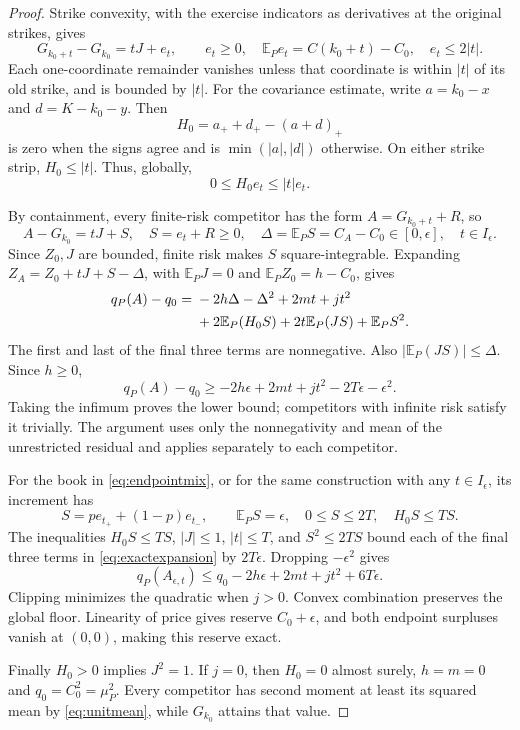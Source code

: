 \documentclass[11pt,a4paper]{amsart}
\theoremstyle{plain}
\theoremstyle{definition}
\theoremstyle{remark}
\newcommand{\EE}{\mathbb{E}}
\begin{document}
\begin{proof}
Strike convexity, with the exercise indicators as derivatives at the original strikes, gives
\begin{equation}\label{eq:strikeremainder}
 G_{k_0+t}-G_{k_0}=tJ+e_t,\qquad
 e_t\ge0,\quad\EE_Pe_t=C(k_0+t)-C_0,\quad e_t\le2|t|.
\end{equation}
Each one-coordinate remainder vanishes unless that coordinate is within $|t|$ of its old strike, and is bounded by $|t|$. For the covariance estimate, write $a=k_0-x$ and $d=K-k_0-y$. Then
\[
 H_0=a_++d_+-(a+d)_+
\]
is zero when the signs agree and is $\min(|a|,|d|)$ otherwise. On either strike strip, $H_0\le|t|$. Thus, globally,
\begin{equation}\label{eq:stripbound}
 0\le H_0e_t\le |t|e_t.
\end{equation}

By containment, every finite-risk competitor has the form $A=G_{k_0+t}+R$, so
\begin{equation}\label{eq:anyincrement}
 A-G_{k_0}=tJ+S,\quad S=e_t+R\ge0,\quad
 \Delta=\EE_PS=C_A-C_0\in[0,\epsilon],\quad t\in I_\epsilon.
\end{equation}
Since $Z_0,J$ are bounded, finite risk makes $S$ square-integrable. Expanding $Z_A=Z_0+tJ+S-\Delta$, with $\EE_PJ=0$ and $\EE_PZ_0=h-C_0$, gives
\begin{align}\label{eq:exactexpansion}
 q_P(A)-q_0={}&-2h\Delta-\Delta^2+2mt+jt^2\notag\\
 &+2\EE_P(H_0S)+2t\EE_P(JS)+\EE_PS^2.
\end{align}
The first and last of the final three terms are nonnegative. Also $|\EE_P(JS)|\le\Delta$. Since $h\ge0$,
\[
 q_P(A)-q_0\ge-2h\epsilon+2mt+jt^2-2T\epsilon-\epsilon^2.
\]
Taking the infimum proves the lower bound; competitors with infinite risk satisfy it trivially. The argument uses only the nonnegativity and mean of the unrestricted residual and applies separately to each competitor.

For the book in \eqref{eq:endpointmix}, or for the same construction with any $t\in I_\epsilon$, its increment has
\[
 S=pe_{t_+}+(1-p)e_{t_-},\qquad
 \EE_PS=\epsilon,\quad 0\le S\le2T,\quad H_0S\le TS.
\]
The inequalities $H_0S\le TS$, $|J|\le1$, $|t|\le T$, and $S^2\le2TS$ bound each of the final three terms in \eqref{eq:exactexpansion} by $2T\epsilon$. Dropping $-\epsilon^2$ gives
\[
 q_P(A_{\epsilon,t})\le q_0-2h\epsilon+2mt+jt^2+6T\epsilon.
\]
Clipping minimizes the quadratic when $j>0$. Convex combination preserves the global floor. Linearity of price gives reserve $C_0+\epsilon$, and both endpoint surpluses vanish at $(0,0)$, making this reserve exact.

Finally $H_0>0$ implies $J^2=1$. If $j=0$, then $H_0=0$ almost surely, $h=m=0$ and $q_0=C_0^2=\mu_P^2$. Every competitor has second moment at least its squared mean by \eqref{eq:unitmean}, while $G_{k_0}$ attains that value.
\end{proof}
\end{document}
